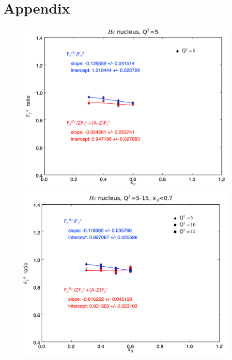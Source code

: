 \documentclass[oneside]{article}
\begin{document}
\section{Appendix}
\begin{figure}[H]
\begin{minipage}{0.5\textwidth}
 \includegraphics[width=\textwidth]{plots/q2_5/q2_5_He.png}
\end{minipage}\hfill\begin{minipage}{0.5\textwidth}
\includegraphics[width=\textwidth]{plots/q2_all_x_l7/q2_all_x_l7_He.png}
\end{minipage}\hfill\begin{minipage}{0.5\textwidth}

\end{minipage}
\end{figure}
\end{document}
